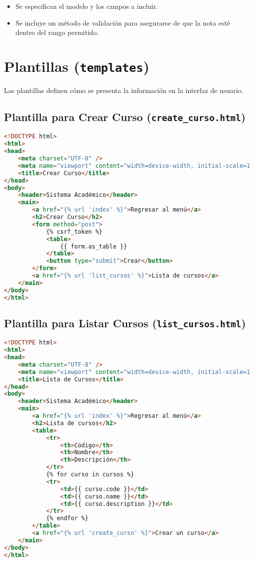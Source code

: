 \begin{itemize}
    \item Se especifican el modelo y los campos a incluir.
    \item Se incluye un método de validación para asegurarse de que la nota esté dentro del rango permitido.
\end{itemize}

\section{Plantillas (\texttt{templates})}

Las plantillas definen cómo se presenta la información en la interfaz de usuario.

\subsection{Plantilla para Crear Curso (\texttt{create\_curso.html})}

\begin{lstlisting}[language=HTML, caption=Plantilla para Crear Curso]
<!DOCTYPE html>
<html>
<head>
    <meta charset="UTF-8" />
    <meta name="viewport" content="width=device-width, initial-scale=1.0" />
    <title>Crear Curso</title>
</head>
<body>
    <header>Sistema Académico</header>
    <main>
        <a href="{% url 'index' %}">Regresar al menú</a>
        <h2>Crear Curso</h2>
        <form method="post">
            {% csrf_token %}
            <table>
                {{ form.as_table }}
            </table>
            <button type="submit">Crear</button>
        </form>
        <a href="{% url 'list_cursos' %}">Lista de cursos</a>
    </main>
</body>
</html>
\end{lstlisting}

\subsection{Plantilla para Listar Cursos (\texttt{list\_cursos.html})}

\begin{lstlisting}[language=HTML, caption=Plantilla para Listar Cursos]
<!DOCTYPE html>
<html>
<head>
    <meta charset="UTF-8" />
    <meta name="viewport" content="width=device-width, initial-scale=1.0" />
    <title>Lista de Cursos</title>
</head>
<body>
    <header>Sistema Académico</header>
    <main>
        <a href="{% url 'index' %}">Regresar al menú</a>
        <h2>Lista de cursos</h2>
        <table>
            <tr>
                <th>Código</th>
                <th>Nombre</th>
                <th>Descripción</th>
            </tr>
            {% for curso in cursos %}
            <tr>
                <td>{{ curso.code }}</td>
                <td>{{ curso.name }}</td>
                <td>{{ curso.description }}</td>
            </tr>
            {% endfor %}
        </table>
        <a href="{% url 'create_curso' %}">Crear un curso</a>
    </main>
</body>
</html>
\end{lstlisting}

